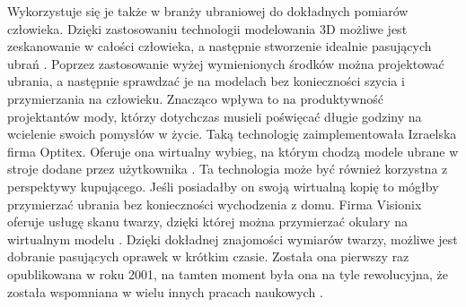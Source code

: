 \newline \indent Wykorzystuje się je także w branży ubraniowej do dokładnych pomiarów człowieka. Dzięki zastosowaniu technologii modelowania 3D możliwe jest zeskanowanie w całości człowieka, a następnie stworzenie idealnie pasujących ubrań \cite{d20073d}. Poprzez zastosowanie wyżej wymienionych środków można projektować ubrania, a następnie sprawdzać je na modelach bez konieczności szycia i przymierzania na człowieku. Znacząco wpływa to na produktywność projektantów mody, którzy dotychczas musieli poświęcać długie godziny na wcielenie swoich pomysłów w życie. Taką technologię zaimplementowała Izraelska firma Optitex. Oferuje ona wirtualny wybieg, na którym chodzą modele ubrane w stroje dodane przez użytkownika \cite{israelVirtualTryOn}.  
Ta technologia może być również korzystna z perspektywy kupującego. Jeśli posiadałby on swoją wirtualną kopię to mógłby przymierzać ubrania bez konieczności wychodzenia z domu. Firma Visionix oferuje usługę skanu twarzy, dzięki której można przymierzać okulary na wirtualnym modelu \cite{visionX}. Dzięki dokładnej znajomości wymiarów twarzy, możliwe jest dobranie pasujących oprawek w krótkim czasie. Została ona pierwszy raz opublikowana w roku 2001, na tamten moment była ona na tyle rewolucyjna, że została wspomniana w wielu innych pracach naukowych \cite{d20073d} \cite{d2006state}.